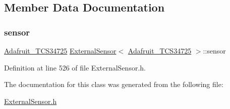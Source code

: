 \subsection{Member Data Documentation}
\mbox{\label{class_external_sensor_3_01_adafruit___t_c_s34725_01_4_aa1c5cc9eec53c08392f63346c9a4cd47}} 
\subsubsection{\texorpdfstring{sensor}{sensor}}
{\footnotesize\ttfamily \hyperlink{class_adafruit___t_c_s34725}{Adafruit\+\_\+\+T\+C\+S34725} \hyperlink{class_external_sensor}{External\+Sensor}$<$ \hyperlink{class_adafruit___t_c_s34725}{Adafruit\+\_\+\+T\+C\+S34725} $>$\+::sensor\hspace{0.3cm}{\ttfamily [private]}}



Definition at line 526 of file External\+Sensor.\+h.



The documentation for this class was generated from the following file\+:\begin{DoxyCompactItemize}
\item 
\hyperlink{_external_sensor_8h}{External\+Sensor.\+h}\end{DoxyCompactItemize}
